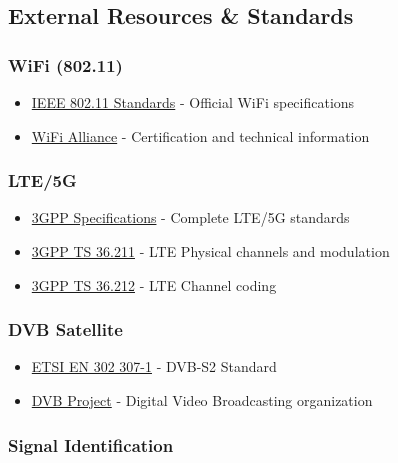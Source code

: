 \subsection{External Resources \&
Standards}\label{external-resources-standards}

\subsubsection{WiFi (802.11)}\label{wifi-802.11}

\begin{itemize}
\tightlist
\item
  \href{https://standards.ieee.org/standard/802_11-2020.html}{IEEE
  802.11 Standards} - Official WiFi specifications
\item
  \href{https://www.wi-fi.org/}{WiFi Alliance} - Certification and
  technical information
\end{itemize}

\subsubsection{LTE/5G}\label{lte5g}

\begin{itemize}
\tightlist
\item
  \href{https://www.3gpp.org/ftp/Specs/archive/}{3GPP Specifications} -
  Complete LTE/5G standards
\item
  \href{https://www.3gpp.org/ftp/Specs/archive/36_series/36.211/}{3GPP
  TS 36.211} - LTE Physical channels and modulation
\item
  \href{https://www.3gpp.org/ftp/Specs/archive/36_series/36.212/}{3GPP
  TS 36.212} - LTE Channel coding
\end{itemize}

\subsubsection{DVB Satellite}\label{dvb-satellite}

\begin{itemize}
\tightlist
\item
  \href{https://www.etsi.org/deliver/etsi_en/302300_302399/30230701/}{ETSI
  EN 302 307-1} - DVB-S2 Standard
\item
  \href{https://www.dvb.org/}{DVB Project} - Digital Video Broadcasting
  organization
\end{itemize}

\subsubsection{Signal Identification}\label{signal-identification}

